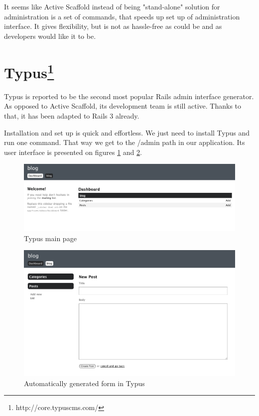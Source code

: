     It seems like Active Scaffold instead of being "stand-alone" solution for administration is a set of commands, that speeds up set up of administration interface. It gives flexibility, but is not as hassle-free as could be and as developers would like it to be.
    
    \section[Typus] {Typus\footnote{http://core.typuscms.com/}}
    Typus is reported to be the second most popular Rails admin interface generator. As opposed to Active Scaffold, its development team is still active. Thanks to that, it has been adapted to Rails 3 already.
    
    Installation and set up is quick and effortless. We just need to install Typus and run one command. That way we get to the /admin path in our application. Its user interface is presented on figures \ref{typus1} and \ref{typus2}.
    
    \begin{figure}[hbt!]
  		\begin{center}
  			\includegraphics[width=\linewidth]{images/chapter01/typus1.png}
  			\caption{Typus main page}
  			\label{typus1}
  		\end{center}
  	\end{figure}
  	
  	\begin{figure}[hbt!]
  		\begin{center}
  			\includegraphics[width=\linewidth]{images/chapter01/typus2.png}
  			\caption{Automatically generated form in Typus}
  			\label{typus2}
  		\end{center}
  	\end{figure}
  
